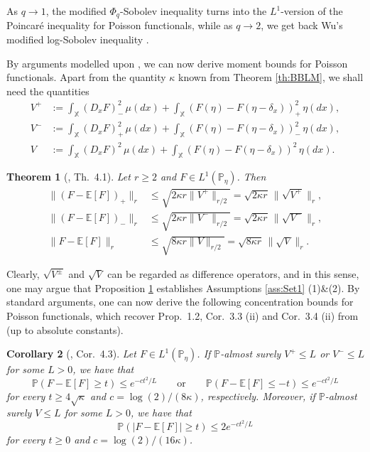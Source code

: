 \documentclass[a4paper,12pt]{amsart}
\numberwithin{equation}{section}
\newtheorem{satz}{Theorem}[section]
\newtheorem{korollar}[satz]{Corollary}
\theoremstyle{remark}
\def\E{{\mathbb E}}
\def\XX{\mathbb{X}}
\newcommand{\PP}{\mathbb{P}}
\begin{document}
As $q \to 1$, the modified $\Phi_q$-Sobolev inequality turns into the $L^1$-version of the Poincar\'e inequality for Poisson functionals, while as $q\to 2$, we get back Wu's modified log-Sobolev inequality \cite[Th.\ 1.1]{Wu00}.

By arguments modelled upon \cite{BBLM05}, we can now derive moment bounds for Poisson functionals. Apart from the quantity $\kappa$ known from Theorem \ref{th:BBLM}, we shall need the quantities
\begin{align*}
V^+ &:= \int_\XX (D_x F)_-^2 \,\mu (d x) + \int_\XX (F(\eta) - F(\eta - \delta_x))_+^2 \,\eta(d x),\\
    V^- &:= \int_\XX (D_x F)_+^2\, \mu (d x) + \int_\XX (F(\eta) - F(\eta - \delta_x))_-^2 \,\eta(d x),\\
    V &:= \int_\XX (D_x F)^2 \,\mu (d x) + \int_\XX (F(\eta) - F(\eta - \delta_x))^2 \,\eta(d x).
\end{align*}

\begin{satz}[\cite{GST21}, Th.\ 4.1]\label{prop:ConcentrationLpBounds}
Let $r\geq 2$ and $F\in L^{1}(\PP_\eta)$. Then
\begin{align*}
\lVert (F-\E[F])_+ \rVert_r &\le \sqrt{2\kappa r \lVert V^+ \rVert_{r/2}} = \sqrt{2\kappa r} \,\lVert \sqrt{V^+} \rVert_r,\\
\lVert (F-\E[F])_- \rVert_r &\le \sqrt{2\kappa r \lVert V^- \rVert_{r/2}} = \sqrt{2\kappa r} \,\lVert \sqrt{V^-} \rVert_r,\\
\lVert F-\E[F] \rVert_r &\le \sqrt{8\kappa r \lVert V \rVert_{r/2}} = \sqrt{8\kappa r}\, \lVert \sqrt{V} \rVert_r.
\end{align*}
\end{satz}

Clearly, $\sqrt{V^\pm}$ and $\sqrt{V}$ can be regarded as difference operators, and in this sense, one may argue that Proposition \ref{prop:ConcentrationLpBounds} establishes Assumptions \ref{ass:Set1} (1)\&(2). By standard arguments, one can now derive the following concentration bounds for Poisson functionals, which recover Prop.\ 1.2, Cor.\ 3.3 (ii) and Cor.\ 3.4 (ii) from \cite{BP16} (up to absolute constants).

\begin{korollar}[\cite{GST21}, Cor.\ 4.3]\label{cortb}
Let $F\in L^1(\PP_\eta)$. If $\PP$-almost surely $V^+ \le L$ or $V^- \le L$ for some $L > 0$, we have that
\[
\PP (F - \E[F] \ge t) \le e^{-ct^2/L}\qquad \text{or}\qquad \PP (F - \E[F] \le -t) \le e^{-ct^2/L}
\]
for every $t \ge 4\sqrt{\kappa}$ and $c = \log(2)/(8\kappa)$, respectively. Moreover, if $\PP$-almost surely $V \le L$ for some $L > 0$, we have that
\[
\PP (|F - \E[F]| \ge t) \le 2e^{-ct^2/L}
\]
for every $t \ge 0$ and $c = \log(2)/(16\kappa)$.
\end{korollar}
\end{document}
